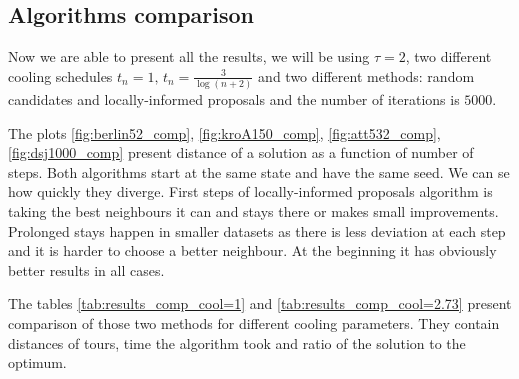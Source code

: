 	
	
\subsection{Algorithms comparison}
	Now we are able to present all the results, we will be using $\tau=2$, two different cooling schedules $t_n=1, \, t_n=\frac{3}{\log(n+2)}$ and two different methods: random candidates and locally-informed proposals and the number of iterations is $5000$.
	
	
	
	The plots \ref{fig:berlin52_comp}, \ref{fig:kroA150_comp}, \ref{fig:att532_comp}, \ref{fig:dsj1000_comp} present distance of a solution as a function of number of steps. Both algorithms start at the same state and have the same seed. We can se how quickly they diverge. First steps of locally-informed proposals algorithm is taking the best neighbours it can and stays there or makes small improvements. Prolonged stays happen in smaller datasets as there is less deviation at each step and it is harder to choose a better neighbour. At the beginning it has obviously better results in all cases. 
	
	
	
	The tables \ref{tab:results_comp_cool=1} and \ref{tab:results_comp_cool=2.73} present comparison of those two methods for different cooling parameters. They contain distances of tours, time the algorithm took and ratio of the solution to the optimum.